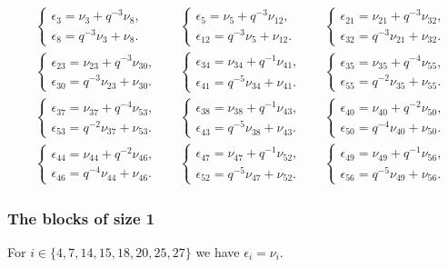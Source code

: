 \begin{align*}
&\begin{cases}
\epsilon_{3} = \nu_{3} + q^{-3}\nu_{8},\\
\epsilon_{8} = q^{-3}\nu_{3} + \nu_{8}.
\end{cases}
&&\begin{cases}
\epsilon_{5} = \nu_{5} + q^{-3}\nu_{12},\\
\epsilon_{12} = q^{-3}\nu_{5} + \nu_{12}.
\end{cases}
&&\begin{cases}
\epsilon_{21} = \nu_{21} + q^{-3}\nu_{32},\\
\epsilon_{32} = q^{-3}\nu_{21} + \nu_{32}.
\end{cases}
\\
&\begin{cases}
\epsilon_{23} = \nu_{23} + q^{-3}\nu_{30},\\
\epsilon_{30} = q^{-3}\nu_{23} + \nu_{30}.
\end{cases}
&&\begin{cases}
\epsilon_{34} = \nu_{34} + q^{-1}\nu_{41},\\
\epsilon_{41} = q^{-5}\nu_{34} + \nu_{41}.
\end{cases}
&&\begin{cases}
\epsilon_{35} = \nu_{35} + q^{-4}\nu_{55},\\
\epsilon_{55} = q^{-2}\nu_{35} + \nu_{55}.
\end{cases}
\\
&\begin{cases}
\epsilon_{37} = \nu_{37} + q^{-4}\nu_{53},\\
\epsilon_{53} = q^{-2}\nu_{37} + \nu_{53}.
\end{cases}
&&\begin{cases}
\epsilon_{38} = \nu_{38} + q^{-1}\nu_{43},\\
\epsilon_{43} = q^{-5}\nu_{38} + \nu_{43}.
\end{cases}
&&\begin{cases}
\epsilon_{40} = \nu_{40} + q^{-2}\nu_{50},\\
\epsilon_{50} = q^{-4}\nu_{40} + \nu_{50}.
\end{cases}
\\
&\begin{cases}
\epsilon_{44} = \nu_{44} + q^{-2}\nu_{46},\\
\epsilon_{46} = q^{-4}\nu_{44} + \nu_{46}.
\end{cases}
&&\begin{cases}
\epsilon_{47} = \nu_{47} + q^{-1}\nu_{52},\\
\epsilon_{52} = q^{-5}\nu_{47} + \nu_{52}.
\end{cases}
&&\begin{cases}
\epsilon_{49} = \nu_{49} + q^{-1}\nu_{56},\\
\epsilon_{56} = q^{-5}\nu_{49} + \nu_{56}.
\end{cases}
\end{align*}

\subsubsection{The blocks of size 1}
For $i\in\{4, 7, 14, 15, 18, 20, 25, 27\}$ we have $\epsilon_i=\nu_i$.

